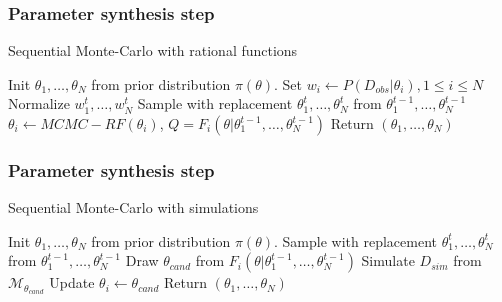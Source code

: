 \documentclass{beamer}
\begin{document}
\begin{frame}
    \frametitle{Parameter synthesis step}    
    \begin{algorithm}[H]
        \caption{Sequential Monte-Carlo with rational functions}
        \label{rf-smc-alg}
        \begin{algorithmic}[1]
            \State Init $\theta_1,\ldots,\theta_N$ from prior distribution $\pi(\theta)$.
            \State Set  $w_i \leftarrow P(D_{obs}|\theta_i), 1\leq i\leq N$
                \State Normalize $w^t_1,\ldots,w^t_N$
                \State Sample with replacement $\theta^t_1,\ldots,\theta^t_N$ from $\theta^{t-1}_1,\ldots,\theta^{t-1}_N$
                    \State $\theta_i \leftarrow MCMC-RF(\theta_i)$, $Q = F_i(\theta|\theta^{t-1}_1,\ldots,\theta^{t-1}_N)$
                \EndFor
            \EndFor
            \State Return $(\theta_1,\ldots,\theta_N)$
            \EndProcedure
        \end{algorithmic}
    \end{algorithm}
\end{frame}

\begin{frame}
    \frametitle{Parameter synthesis step}    
    \begin{algorithm}[H]
        \caption{Sequential Monte-Carlo with simulations}
        \label{smc-abc-smc-alg}
        \begin{algorithmic}[1]
            \State Init $\theta_1,\ldots,\theta_N$ from prior distribution $\pi(\theta)$.
                \State Sample with replacement $\theta^t_1,\ldots,\theta^t_N$ from $\theta^{t-1}_1,\ldots,\theta^{t-1}_N$
                    \State Draw $\theta_{cand}$ from $F_i(\theta|\theta^{t-1}_1,\ldots,\theta^{t-1}_N)$
                        \State Simulate $D_{sim}$ from $\mathcal{M}_{\theta_{cand}}$
                            \State Update $\theta_i \leftarrow \theta_{cand}$
                        \EndIf
                    \EndIf
                \EndFor
            \EndFor
            \State Return $(\theta_1,\ldots,\theta_N)$
            \EndProcedure
        \end{algorithmic}
    \end{algorithm}
\end{frame}
\end{document}
